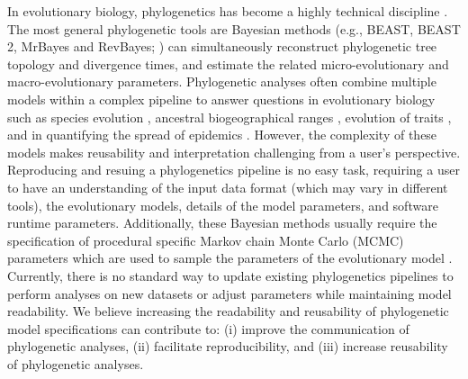 \documentclass[10pt,letterpaper,table]{article}
\begin{document}
In evolutionary biology, phylogenetics has become a highly technical discipline \cite{oakley2014osiris}. 
The most general phylogenetic tools are Bayesian methods (e.g., BEAST, BEAST 2, MrBayes and
RevBayes; \cite{beast,beast2,revbayes,mrbayes}) 
can simultaneously reconstruct phylogenetic tree topology and divergence times, and estimate the related micro-evolutionary and macro-evolutionary parameters. 
Phylogenetic analyses often combine 
multiple models within a complex pipeline to answer questions in evolutionary biology such as species evolution \cite{gavryushkina17,ogilvie21,zhang21}, ancestral biogeographical ranges \cite{lemey10,landis18}, 
evolution of traits \cite{may19,bite}, and in 
quantifying the spread of epidemics \cite{faria21,douglas21}. 
However, the complexity of these models makes reusability and interpretation challenging from a user's perspective.   
Reproducing and resuing a phylogenetics pipeline is no easy task, requiring a user to have an understanding of the input data format (which may vary in different tools), the evolutionary models, details of the model parameters, and software runtime parameters. 
Additionally, these Bayesian methods usually require the specification of procedural specific Markov chain Monte Carlo (MCMC) parameters which are used to sample the parameters of the evolutionary model \cite{beast,beast2,revbayes,mrbayes}. 
Currently, there is no standard way to update existing phylogenetics pipelines to perform analyses on new datasets or adjust parameters while maintaining model readability. 
We believe increasing the readability and reusability of phylogenetic model specifications can contribute to: (i) improve the communication of phylogenetic analyses, (ii) facilitate reproducibility, and (iii) increase reusability of phylogenetic analyses. 
\end{document}
